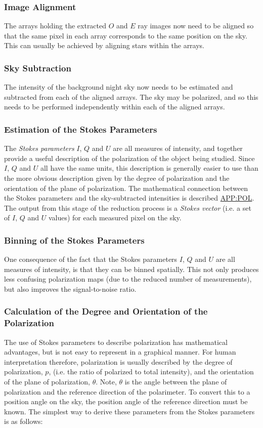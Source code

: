 \subsubsection{Image Alignment}
The arrays holding the extracted $O$ and $E$ ray images now need to be
aligned so that the same pixel in each array corresponds to the same
position on the sky. This can usually be achieved by aligning stars
within the arrays.

\subsubsection{Sky Subtraction}
The intensity of the background night sky now needs to be estimated and
subtracted from each of the aligned arrays. The sky may be polarized, and
so this needs to be performed independently within each of the aligned arrays.

\subsubsection{Estimation of the Stokes Parameters}
The {\em Stokes parameters} $I$, $Q$ and $U$ are all measures of intensity,
and together provide a useful description of the polarization of the object
being studied. Since $I$, $Q$ and $U$ all have the same units, this
description is generally easier to use than the more obvious description
given by the degree of polarization and the orientation of the plane of
polarization. The mathematical connection between the Stokes parameters 
and the sky-subtracted intensities is described \hyperref{here}{in
appendix }{}{APP:POL}. The output from this stage of the reduction process
is a {\em Stokes vector} (i.e. a set of $I$, $Q$ and $U$ values) for each
measured pixel on the sky.

\subsubsection{Binning of the Stokes Parameters}
One consequence of the fact that the Stokes parameters $I$, $Q$ and $U$
are all measures of intensity, is that they can be binned spatially. This
not only produces less confusing polarization maps (due to the reduced
number of measurements), but also improves the signal-to-noise ratio.

\subsubsection{Calculation of the Degree and Orientation of the Polarization}
The use of Stokes parameters to describe polarization has mathematical
advantages, but is not easy to represent in a graphical manner. For human
interpretation therefore, polarization is usually described by the degree
of polarization, $p$, (i.e. the ratio of polarized to total intensity),
and the orientation of the plane of polarization, $\theta$. Note,
$\theta$ is the angle between the plane of polarization and the reference
direction of the polarimeter. To convert this to a position angle on the
sky, the position angle of the reference direction must be known. The
simplest way to derive these parameters from the Stokes parameters is as
follows:

